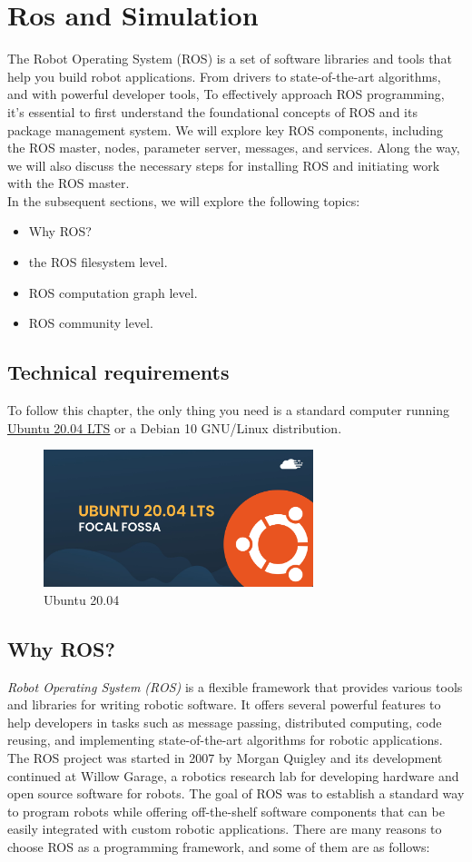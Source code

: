 \documentclass[../../main]{subfiles}
\begin{document}
\section{Ros and Simulation}
The Robot Operating System (ROS) is a set of software libraries and tools that help you build robot applications. 
From drivers to state-of-the-art algorithms, and with powerful developer tools, \cite{ros_website}
To effectively approach ROS programming, it's essential to first understand the foundational concepts of ROS and its package management system. 
We will explore key ROS components, including the ROS master, nodes, parameter server, messages, and services. 
Along the way, we will also discuss the necessary steps for installing ROS and initiating work with the ROS master.\\
In the subsequent sections, we will explore the following topics:
\begin{itemize}
\item  Why ROS?
\item  the ROS filesystem level.
\item  ROS computation graph level.
\item  ROS community level.
\end{itemize}
\subsection*{Technical requirements}
To follow this chapter, the only thing you need is a 
standard computer running \href{https://releases.ubuntu.com/20.04/}{Ubuntu 20.04 LTS} or a Debian 10 GNU/Linux 
distribution.
\begin{figure}[h!]
    \centering
    \includegraphics[width=0.7\textwidth]{img/ubuntu.png}
    \caption{Ubuntu 20.04}
\end{figure}
\newpage
\subsection{Why ROS?}\cite{joseph2018mastering}
\emph{Robot Operating System (ROS)} is a flexible framework that provides various tools and
libraries for writing robotic software. It offers several powerful features to help developers
in tasks such as message passing, distributed computing, code reusing, and implementing
state-of-the-art algorithms for robotic applications. The ROS project was started in 2007
by Morgan Quigley and its development continued at Willow Garage, a robotics research
lab for developing hardware and open source software for robots. The goal of ROS was
to establish a standard way to program robots while offering off-the-shelf software
components that can be easily integrated with custom robotic applications. There are
many reasons to choose ROS as a programming framework, and some of them are as
follows:
\end{document}
